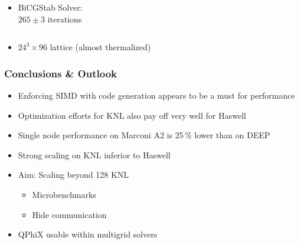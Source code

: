 \documentclass{beamer}
\begin{document}
\begin{frame}
\begin{columns}
\begin{column}{0.5\linewidth}
\begin{itemize}
            \vspace{1.5ex}

          \item BiCGStab Solver: \\ $265 \pm 3$ iterations
        \end{itemize}
      \end{column}
    \end{columns}


    \begin{small}
      \begin{itemize}
        \item $24^3 \times 96$ lattice (almost thermalized)
      \end{itemize}
    \end{small}


  \end{frame}


  \begin{frame}
    \frametitle{Conclusions \& Outlook}

    \begin{itemize}
        \item Enforcing SIMD with code generation appears to be a must for
          performance
        \item Optimization efforts for KNL also pay off very well for Haswell
    \end{itemize}

    \vfill

    \begin{itemize}
      \item Single node performance on Marconi A2 is 25\,\% lower than on DEEP
      \item Strong scaling on KNL inferior to Haswell
    \end{itemize}

    \vfill

    \begin{itemize}
      \item Aim: Scaling beyond 128 KNL
        \begin{itemize}
            \item Microbenchmarks
            \item Hide communication
        \end{itemize}
      \item QPhiX usable within multigrid solvers
    \end{itemize}
  \end{frame}


  \begin{frame}
    \titlepage
  \end{frame}

  
\end{document}
